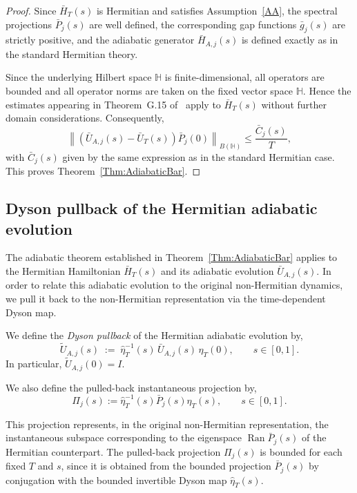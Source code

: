 \documentclass[pdflatex,sn-mathphys-num]{sn-jnl}
\theoremstyle{thmstyleone}
\theoremstyle{thmstyletwo}
\theoremstyle{thmstylethree}
\begin{document}
\begin{proof}
Since \(\bar H_T(s)\) is Hermitian and satisfies Assumption~\ref{AA}, the spectral projections $\bar P_j(s)$ are
well defined, the corresponding gap functions $\bar g_j(s)$ are strictly positive, and the
adiabatic generator $\bar H_{A,j}(s)$ is defined exactly as in the standard Hermitian
theory.

Since the underlying Hilbert space $\mathbb{H}$ is finite-dimensional, all operators are
bounded and all operator norms are taken on the fixed vector space $\mathbb{H}$. Hence the
estimates appearing in Theorem~G.15 of~\cite{Scherer2019} apply to $\bar H_T(s)$ without
further domain considerations. Consequently,
\[
\left\|(\bar U_{A,j}(s)-\bar U_T(s))\bar P_j(0)\right\|_{B(\mathbb{H})}
\le \frac{\bar C_j(s)}{T},
\]
with $\bar C_j(s)$ given by the same expression as in the standard Hermitian case. This
proves Theorem~\ref{Thm:AdiabaticBar}.
\end{proof}

\subsection{Dyson pullback of the Hermitian adiabatic evolution}

The adiabatic theorem established in Theorem~\ref{Thm:AdiabaticBar} applies to the Hermitian
Hamiltonian $\bar H_T(s)$ and its adiabatic evolution $\bar U_{A,j}(s)$. In order to relate
this adiabatic evolution to the original non-Hermitian dynamics, we pull it back to the
non-Hermitian representation via the time-dependent Dyson map.

We define the \emph{Dyson pullback} of the Hermitian adiabatic evolution by,
\begin{equation}\label{3.7}
 \widetilde U_{A,j}(s)
 \;:=\;
 \hat\eta_T^{-1}(s)\,\bar U_{A,j}(s)\,\hat\eta_T(0),
 \qquad s\in[0,1].
\end{equation}
In particular, $\widetilde U_{A,j}(0)=I$.

We also define the pulled-back instantaneous projection by,
\begin{equation}\label{ip}
    \Pi_j(s):=\hat\eta_T^{-1}(s)\bar P_j(s)\hat\eta_T(s),
\qquad s\in[0,1].
\end{equation}

This projection represents, in the original non-Hermitian representation, the instantaneous
subspace corresponding to the eigenspace $\operatorname{Ran}\bar P_j(s)$ of the Hermitian
counterpart. The pulled-back projection \(\Pi_j(s)\) is bounded for each fixed \(T\) and
\(s\), since it is obtained from the bounded projection \(\bar P_j(s)\) by
conjugation with the bounded invertible Dyson map \(\hat\eta_T(s)\).
\end{document}
